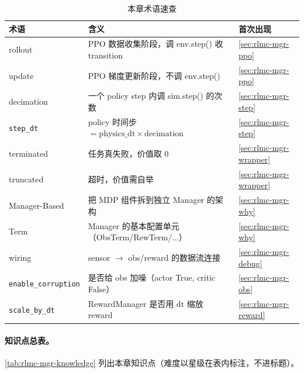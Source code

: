 \begin{table}[H]
\centering
\caption{本章术语速查}
\label{tab:rlmc-mgr-glossary}
\footnotesize
\begin{tabular}{@{}lll@{}}
\toprule
术语 & 含义 & 首次出现 \\
\midrule
rollout & PPO 数据收集阶段，调 env.step() 收 transition & \cref{sec:rlmc-mgr-ppo} \\
update & PPO 梯度更新阶段，不调 env.step() & \cref{sec:rlmc-mgr-ppo} \\
decimation & 一个 policy step 内调 sim.step() 的次数 & \cref{sec:rlmc-mgr-step} \\
\verb|step_dt| & policy 时间步 $=\text{physics\_dt}\times\text{decimation}$ & \cref{sec:rlmc-mgr-step} \\
terminated & 任务真失败，价值取 0 & \cref{sec:rlmc-mgr-wrapper} \\
truncated & 超时，价值需自举 & \cref{sec:rlmc-mgr-wrapper} \\
Manager-Based & 把 MDP 组件拆到独立 Manager 的架构 & \cref{sec:rlmc-mgr-why} \\
Term & Manager 的基本配置单元（ObsTerm/RewTerm/...） & \cref{sec:rlmc-mgr-why} \\
wiring & sensor $\to$ obs/reward 的数据流连接 & \cref{sec:rlmc-mgr-debug} \\
\verb|enable_corruption| & 是否给 obs 加噪（actor True, critic False） & \cref{sec:rlmc-mgr-obs} \\
\verb|scale_by_dt| & RewardManager 是否用 dt 缩放 reward & \cref{sec:rlmc-mgr-reward} \\
\bottomrule
\end{tabular}
\end{table}

\paragraph{知识点总表。}\cref{tab:rlmc-mgr-knowledge} 列出本章知识点（难度以星级在表内标注，不进标题）。


